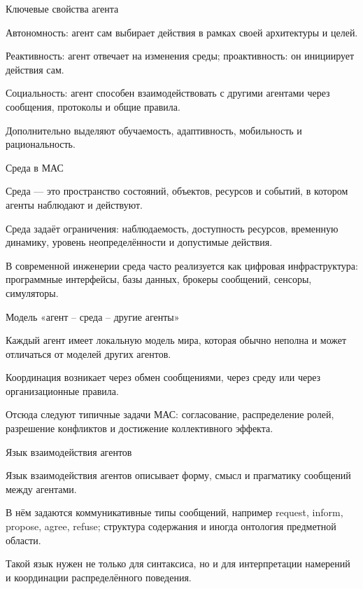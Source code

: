 \begin{frame}{Ключевые свойства агента}
	\topline
	\justifying
	\begin{textitemize}
		\item Автономность: агент сам выбирает действия в рамках своей архитектуры и целей.
		\item Реактивность: агент отвечает на изменения среды; проактивность: он инициирует действия сам.
		\item Социальность: агент способен взаимодействовать с другими агентами через сообщения, протоколы и общие правила.
		\item Дополнительно выделяют обучаемость, адаптивность, мобильность и рациональность.
	\end{textitemize}
\end{frame}

\begin{frame}{Среда в МАС}
	\topline
	\justifying
	\begin{textitemize}
		\item Среда --- это пространство состояний, объектов, ресурсов и событий, в котором агенты наблюдают и действуют.
		\item Среда задаёт ограничения: наблюдаемость, доступность ресурсов, временную динамику, уровень неопределённости и допустимые действия.
		\item В современной инженерии среда часто реализуется как цифровая инфраструктура: программные интерфейсы, базы данных, брокеры сообщений, сенсоры, симуляторы.
	\end{textitemize}
\end{frame}

\begin{frame}{Модель «агент -- среда -- другие агенты»}
	\topline
	\justifying
	\begin{textitemize}
		\item Каждый агент имеет локальную модель мира, которая обычно неполна и может отличаться от моделей других агентов.
		\item Координация возникает через обмен сообщениями, через среду или через организационные правила.
		\item Отсюда следуют типичные задачи МАС: согласование, распределение ролей, разрешение конфликтов и достижение коллективного эффекта.
	\end{textitemize}
\end{frame}

\begin{frame}{Язык взаимодействия агентов}
	\topline
	\justifying
	\begin{textitemize}
		\item Язык взаимодействия агентов описывает форму, смысл и прагматику сообщений между агентами.
		\item В нём задаются коммуникативные типы сообщений, например request, inform, propose, agree, refuse; структура содержания и иногда онтология предметной области.
		\item Такой язык нужен не только для синтаксиса, но и для интерпретации намерений и координации распределённого поведения.
	\end{textitemize}
\end{frame}

